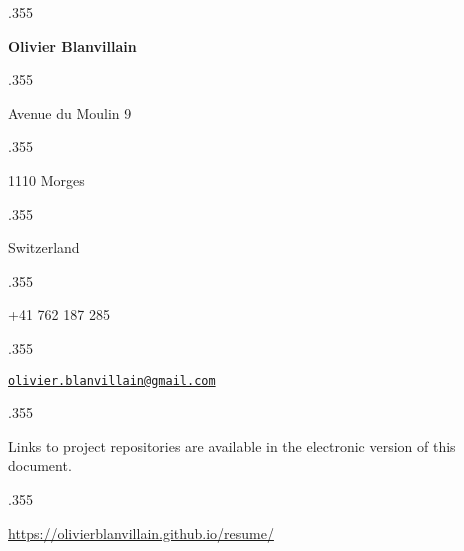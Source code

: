 \documentclass[margin]{res}
\let\link\href
\renewcommand{\href}[2]{\link{#1}{\scriptsize{\faExternalLink}}}
\newcommand{\centered}[1]{\moveleft.355\hoffset\centerline{#1}}
\begin{document}
\centered{\LARGE\textbf{Olivier Blanvillain}}
\vspace{3pt}
\centered{Avenue du Moulin 9}
\centered{1110 Morges}
\centered{Switzerland}
\vspace{3pt}
\centered{+41 762 187 285}
\centered{\link{mailto:olivier.blanvillain@gmail.com}{\texttt{olivier.blanvillain@gmail.com}}}

\begin{resume}
  
\end{resume}

\vspace{25pt}

\centered{\footnotesize Links to project repositories are available in the electronic version of this document.}
\centered{\footnotesize\url{https://olivierblanvillain.github.io/resume/}}
\end{document}
